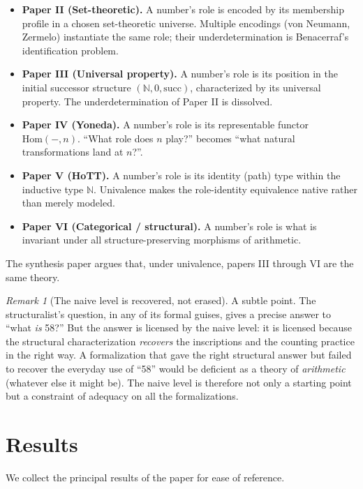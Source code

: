 \documentclass[12pt]{article}
\theoremstyle{definition}
\theoremstyle{remark}
\newtheorem{remark}[theorem]{Remark}
\begin{document}
\begin{itemize}
\item \textbf{Paper II (Set-theoretic).} A number's role is encoded by
its membership profile in a chosen set-theoretic universe. Multiple
encodings (von Neumann, Zermelo) instantiate the same role; their
underdetermination is Benacerraf's identification problem.
\item \textbf{Paper III (Universal property).} A number's role is its
position in the initial successor structure $(\mathbb{N}, 0,
\mathrm{succ})$, characterized by its universal property. The
underdetermination of Paper II is dissolved.
\item \textbf{Paper IV (Yoneda).} A number's role is its representable
functor $\mathrm{Hom}(-, n)$. ``What role does $n$ play?'' becomes
``what natural transformations land at $n$?''.
\item \textbf{Paper V (HoTT).} A number's role is its identity (path)
type within the inductive type $\mathbb{N}$. Univalence makes the
role-identity equivalence native rather than merely modeled.
\item \textbf{Paper VI (Categorical / structural).} A number's role
is what is invariant under all structure-preserving morphisms of
arithmetic.
\end{itemize}

The synthesis paper argues that, under univalence, papers III through
VI are the same theory.

\begin{remark}[The naive level is recovered, not erased]
\label{rem:recovery}
A subtle point. The structuralist's question, in any of its formal
guises, gives a precise answer to ``what \emph{is} 58?'' But the answer
is licensed by the naive level: it is licensed because the structural
characterization \emph{recovers} the inscriptions and the counting practice
in the right way. A formalization that gave the right structural answer
but failed to recover the everyday use of ``58'' would be deficient as a
theory of \emph{arithmetic} (whatever else it might be). The naive level
is therefore not only a starting point but a constraint of adequacy on
all the formalizations.
\end{remark}

\section{Results}
\label{sec:results}

We collect the principal results of the paper for ease of reference.
\end{document}
